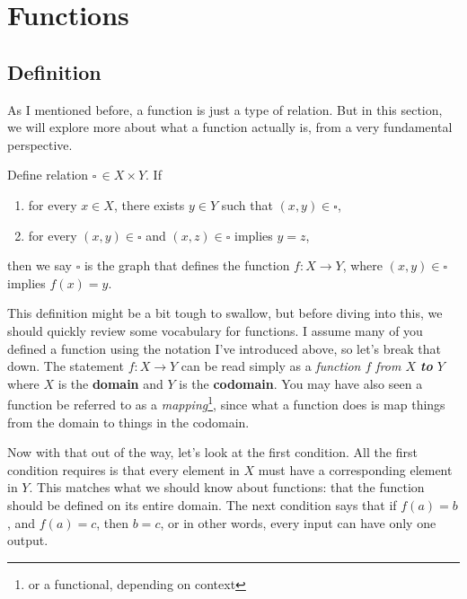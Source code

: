 \documentclass[11pt]{article}
\numberwithin{lemma}{section}
\numberwithin{equation}{section}
\numberwithin{define}{section}
\numberwithin{prop}{section}
\numberwithin{figure}{section}
\numberwithin{theorem}{section}
\newcounter{ex}[section]
\numberwithin{ex}{section}
\begin{document}
\section{Functions}
\subsection{Definition}
As I mentioned before, a function is just a type of relation. But in this section, we will explore more about what a function actually is, from a very fundamental perspective. 
\begin{define}
	Define relation $\square\,\in X\times Y$. If
	\begin{enumerate}
		\item for every $x\in X$, there exists $y\in Y$ such that $(x,y)\in \square$,
		\item for every $(x,y)\in \square$ and $(x,z)\in \square$ implies $y=z$,
	\end{enumerate}
	then we say $\square$ is the graph\footnotemark
	that defines the function $f:X\to Y$, where $(x,y)\in\square$ implies $f(x)=y$.
\end{define}
This definition might be a bit tough to swallow, but before diving into this, we should quickly review some vocabulary for functions. I assume many of you defined a function using the notation I've introduced above, so let's break that down. 
The statement $f:X\to Y$ can be read simply as a \textit{function $f$ from $X$ \textbf{to} $Y$} where $X$ is the \textbf{domain} and $Y$ is the \textbf{codomain}. 
You may have also seen a function be referred to as a \textit{mapping}\footnote{or a functional, depending on context}, since what a function does is map things from the domain to things in the codomain. 

Now with that out of the way, let's look at the first condition. All the first condition requires is that every element in $X$ must have a corresponding element in $Y$. 
This matches what we should know about functions: that the function should be defined on its entire domain.
The next condition says that if $f(a)=b$, and $f(a)=c$, then $b=c$, or in other words, every input can have only one output.
\end{document}
